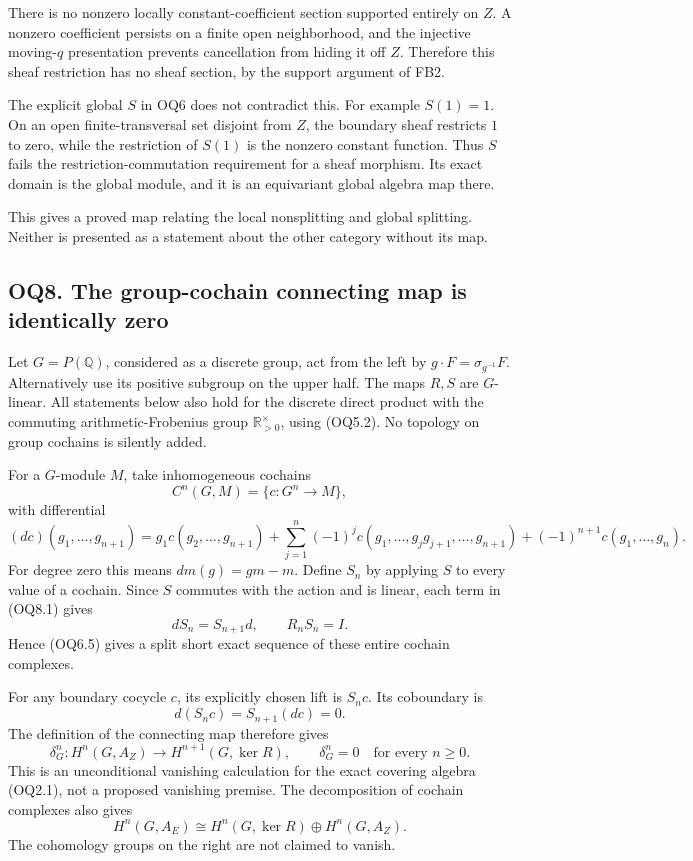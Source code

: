 There is no nonzero locally constant-coefficient section supported
entirely on \(Z\). A nonzero coefficient persists on a finite open
neighborhood, and the injective moving-\(q\) presentation prevents
cancellation from hiding it off \(Z\). Therefore this sheaf restriction
has no sheaf section, by the support argument of FB2.

The explicit global \(S\) in OQ6 does not contradict this. For example
\(S(1)=1\). On an open finite-transversal set disjoint from \(Z\), the
boundary sheaf restricts \(1\) to zero, while the restriction of
\(S(1)\) is the nonzero constant function. Thus \(S\) fails the
restriction-commutation requirement for a sheaf morphism. Its exact
domain is the global module, and it is an equivariant global algebra map
there.

This gives a proved map relating the local nonsplitting and global
splitting. Neither is presented as a statement about the other category
without its map.

\subsection{OQ8. The group-cochain connecting map is identically
zero}\label{oq8.-the-group-cochain-connecting-map-is-identically-zero}

Let \(G=P(\mathbb Q)\), considered as a discrete group, act from the
left by \(g\cdot F=\sigma_{g^{-1}}F\). Alternatively use its positive
subgroup on the upper half. The maps \(R,S\) are \(G\)-linear. All
statements below also hold for the discrete direct product with the
commuting arithmetic-Frobenius group \(\mathbb R_{>0}^{\times}\), using
(OQ5.2). No topology on group cochains is silently added.

For a \(G\)-module \(M\), take inhomogeneous cochains \[
C^n(G,M)=\{c:G^n\to M\},
\] with differential \[
(dc)(g_1,\ldots,g_{n+1})
=g_1c(g_2,\ldots,g_{n+1})
+\sum_{j=1}^{n}(-1)^j
c(g_1,\ldots,g_jg_{j+1},\ldots,g_{n+1})
+(-1)^{n+1}c(g_1,\ldots,g_n).
\tag{OQ8.1}
\] For degree zero this means \(dm(g)=gm-m\). Define \(S_n\) by applying
\(S\) to every value of a cochain. Since \(S\) commutes with the action
and is linear, each term in (OQ8.1) gives \[
dS_n=S_{n+1}d,\qquad R_nS_n=I.
\tag{OQ8.2}
\] Hence (OQ6.5) gives a split short exact sequence of these entire
cochain complexes.

For any boundary cocycle \(c\), its explicitly chosen lift is \(S_nc\).
Its coboundary is \[
d(S_nc)=S_{n+1}(dc)=0.
\] The definition of the connecting map therefore gives \[
\boxed{
\delta_G^n:H^n(G,A_Z)\longrightarrow H^{n+1}(G,\ker R),
\qquad \delta_G^n=0
\quad\text{for every }n\ge0.}
\tag{OQ8.3}
\] This is an unconditional vanishing calculation for the exact covering
algebra (OQ2.1), not a proposed vanishing premise. The decomposition of
cochain complexes also gives \[
H^n(G,A_E)
\cong H^n(G,\ker R)\oplus H^n(G,A_Z).
\tag{OQ8.4}
\] The cohomology groups on the right are not claimed to vanish.

